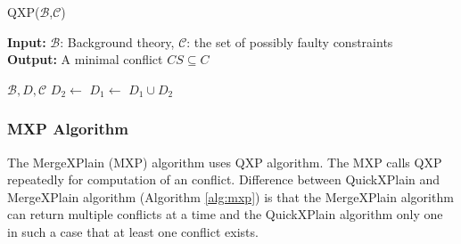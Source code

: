 \documentclass[12pt,a4paper]{article}
\begin{document}
\begin{algorithm}[H]
	\footnotesize
	\caption{QXP($\mathcal{B}$,$\mathcal{C}$)}
	\label{alg:qxp}
	\textbf{Input:} $\mathcal{B}$: Background theory, $\mathcal{C}$: the set of possibly faulty constraints  \\
	\textbf{Output:} A minimal conflict $CS \subseteq C$
	\begin{algorithmic}[1]
		\State {}
		\State \Return {$\emptyset$}
		\EndIf
		\State \Return {}
		
		\medskip
		 {$\mathcal{B}, D, \mathcal{C}$}
		\State \Return {$\emptyset$}
		\EndIf
		\State {}
		\EndIf
		\State $D_{2} \gets$ 
		\State $D_{1} \gets$ 
		\State \Return $D_{1} \cup D_{2}$
		\EndFunction			
	\end{algorithmic}
\end{algorithm}

\subsubsection{MXP Algorithm}
The MergeXPlain (MXP) algorithm uses QXP algorithm. The MXP calls QXP repeatedly for computation of an conflict. Difference between QuickXPlain and MergeXPlain algorithm (Algorithm \ref{alg:mxp}) is that the MergeXPlain algorithm can return multiple conflicts at a time and the QuickXPlain algorithm only one in such a case that at least one conflict exists. 
\end{document}
